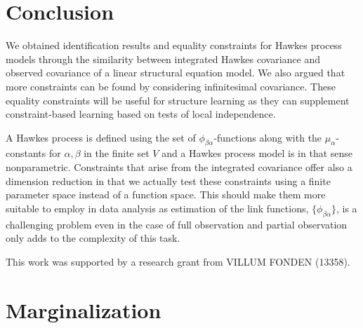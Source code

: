 \documentclass[accepted]{uai2021} %
\begin{document}

\section{Conclusion}

We obtained identification results and equality constraints for Hawkes process 
models through the similarity between integrated Hawkes covariance and observed 
covariance of a linear structural equation model. We also argued that more 
constraints can be found by considering infinitesimal covariance. These 
equality constraints will be useful for structure learning as they can 
supplement constraint-based learning based on tests of local independence.

A Hawkes process is defined using the set of $\phi_{\beta\alpha}$-functions 
along 
with the $\mu_\alpha$-constants for $\alpha,\beta$ in the finite set $V$ and a 
Hawkes process model is in that sense nonparametric.  Constraints that arise 
from the integrated covariance offer also a dimension reduction in that we 
actually test these constraints using a finite parameter space instead of a 
function space. This should make them more suitable to employ in data analysis 
as estimation of the link functions, $\{\phi_{\beta\alpha} \}$, is a 
challenging problem even in the case of full 
observation and partial observation only adds to the 
complexity of this task.





\begin{contributions} %

\end{contributions}

\begin{acknowledgements} %
    This work was supported by a research grant from
    VILLUM FONDEN (13358).
\end{acknowledgements}

\appendix

\section{Marginalization}
\label{sec:marg}
\end{document}
